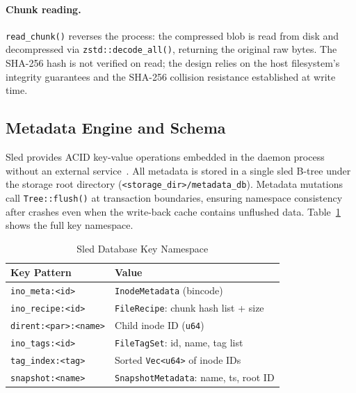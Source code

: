 \documentclass[5p,times]{elsarticle}
\begin{document}
\paragraph{Chunk reading.}
\texttt{read\_chunk()} reverses the process: the compressed blob is
read from disk and decompressed via \texttt{zstd::decode\_all()},
returning the original raw bytes.  The SHA-256 hash is not verified
on read; the design relies on the host filesystem's integrity guarantees
and the SHA-256 collision resistance established at write time.

\subsection{Metadata Engine and Schema}

Sled provides ACID key-value operations embedded in the daemon process
without an external service~\cite{sled2024}.  All metadata is stored
in a single sled B-tree under the storage root directory
(\texttt{<storage\_dir>/metadata\_db}).  Metadata mutations call
\texttt{Tree::flush()} at transaction boundaries, ensuring namespace
consistency after crashes even when the write-back cache contains
unflushed data.  Table~\ref{tab:schema} shows the full key namespace.

\begin{table}[t]
\caption{Sled Database Key Namespace}
\label{tab:schema}
\centering
\renewcommand{\arraystretch}{1.2}
\footnotesize
\begin{tabular}{p{4.2cm}p{3.6cm}}
\toprule
\textbf{Key Pattern} & \textbf{Value} \\
\midrule
\texttt{ino\_meta:\textless{}id\textgreater{}} &
  \texttt{InodeMetadata} (bincode) \\
\texttt{ino\_recipe:\textless{}id\textgreater{}} &
  \texttt{FileRecipe}: chunk hash list + size \\
\texttt{dirent:\textless{}par\textgreater{}:\textless{}name\textgreater{}} &
  Child inode ID (\texttt{u64}) \\
\texttt{ino\_tags:\textless{}id\textgreater{}} &
  \texttt{FileTagSet}: id, name, tag list \\
\texttt{tag\_index:\textless{}tag\textgreater{}} &
  Sorted \texttt{Vec\textless{}u64\textgreater{}} of inode IDs \\
\texttt{snapshot:\textless{}name\textgreater{}} &
  \texttt{SnapshotMetadata}: name, ts, root ID \\
\bottomrule
\end{tabular}
\end{table}
\end{document}
